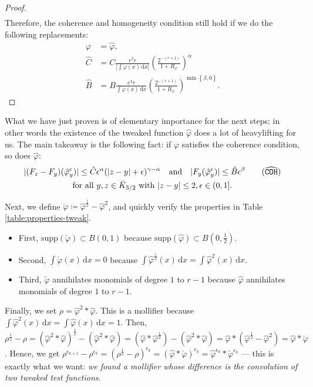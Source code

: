 \begin{proof}
\begin{align*}
    \end{align*}
    Therefore, the coherence and homogeneity condition still hold if we do the following replacements:
    \begin{align}
        \varphi &= \hat \varphi, \nonumber
        \\
        \hat C &= C\frac{e^2 r}{|\int \varphi(x)\, \mathrm{d}x|} \left(\frac{2^{-(r+1)}}{1+R_\varphi}\right)^\alpha \label{constant:hat-c}
        \\
        \hat B &= B\frac{e^2 r}{\int \varphi(x)\, \mathrm{d}x} \left(\frac{2^{-(r+1)}}{1+R_\varphi}\right)^{\min\left\{ \beta, 0 \right\} } \nonumber.
    \end{align}
\end{proof}

What we have just proven is of elementary importance for the next steps; in other words the existence of the tweaked function $\hat \varphi$ does a lot of heavylifting for us. The main takeaway is the following fact: if $\varphi$ satisfies the coherence condition, so does $\hat \varphi$:
\begin{gather}\label{coherence-hat}
    |(F_z - F_y)(\hat \varphi^\epsilon_y)| \leq \hat C \epsilon^\alpha(|z-y| + \epsilon)^{\gamma - \alpha} \quad \text{and} \quad |F_y(\hat \varphi^\epsilon_y)| \leq \hat B\epsilon^\beta \tag{${\widehat{\texttt{COH}}}$} \\
    \text{for all } y,z \in \bar K_{3/2} \text{ with } |z-y| \leq 2,  \epsilon \in (0,1] .\nonumber
\end{gather}

Next, we define $\check \varphi \coloneqq \hat \varphi^{\frac{1}{2}} - \hat \varphi^2$, and quickly verify the properties in Table \ref{table:properties-tweak}.
\begin{itemize}
    \item First, $\mathrm{supp}(\check \varphi) \subset B(0,1)$ because $\mathrm{supp}(\hat \varphi) \subset B(0,\frac{1}{2})$.
    \item Second, $\int \check \varphi(x) \, \mathrm{d}x = 0$ because $\int \hat \varphi^{\frac{1}{2}}(x) \, \mathrm{d}x = \int \hat \varphi^2(x) \, \mathrm{d}x$.
    \item Third, $\check \varphi$ annihilates monomials of degree $1$ to $r-1$ because  $\hat \varphi$ annihilates monomials of degree $1$ to $r-1$.
\end{itemize}

Finally, we set $\rho = \hat \varphi^2 * \hat \varphi$. This is a mollifier because $\int \hat \varphi^2(x) \, \mathrm{d}x = \int \hat \varphi(x)  \, \mathrm{d}x = 1$.  Then, $\rho^{\frac{1}{2}} - \rho = (\hat \varphi^2 * \hat \varphi)^{\frac{1}{2}} - (\hat \varphi^2 * \hat \varphi) = (\hat \varphi * \hat \varphi^{\frac{1}{2}})- (\hat \varphi^2 * \hat \varphi) = \hat \varphi * (\hat \varphi^{\frac{1}{2}} - \hat \varphi^{2}) = \hat \varphi * \check \varphi$. Hence, we get $\rho^{\epsilon_{k+1}} - \rho^{\epsilon_k} = (\rho^{\frac{1}{2}} - \rho)^{\epsilon_k} = (\hat \varphi * \check \varphi)^{\epsilon_k} = \hat \varphi^{\epsilon_k} * \check \varphi^{\epsilon_k}$ --- this is exactly what we want: \emph{we found a mollifier whose difference is the convolution of two tweaked test functions}.

